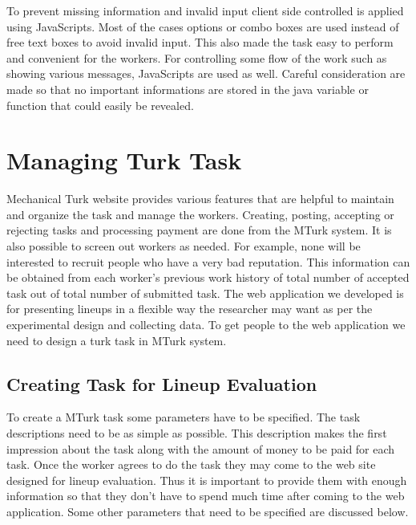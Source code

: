 \documentclass[11pt]{article}
\begin{document}
To prevent missing information and invalid input client side controlled is applied using JavaScripts. Most of the cases options or combo boxes are used instead of free text boxes to avoid invalid input. This also made the task easy to perform and convenient for the workers. For controlling some flow of the work such as showing various messages, JavaScripts are used as well. Careful consideration are made so that no important informations are stored in the java variable or function that could easily be revealed.


\section{Managing Turk Task}\label{sec:turk_task} \cite{turk} Mechanical Turk website provides various features that are helpful to maintain and organize the task and manage the workers. Creating, posting, accepting or rejecting tasks and processing payment are done from the MTurk system. It is also possible to screen out workers as needed. For example, none will be interested to recruit people who have a very bad reputation. This information can be obtained from each worker's previous work history of total number of accepted task out of total number of submitted task. The web application we developed is for presenting lineups in a flexible way the researcher may want  as per the experimental design and collecting data. To get people to the web application we need to design a turk task in MTurk system.



\subsection{Creating Task for Lineup Evaluation} To create a MTurk task some parameters have to be specified. The task descriptions need to be as simple as possible. This description makes the first impression about the task along with the amount of money to be paid for each task. Once the worker agrees to do the task they may come to the web site designed for lineup evaluation. Thus it is important to provide them with enough information so that they don't have to spend much time after coming to the web application. Some other parameters that need to be specified are discussed below.
\end{document}
